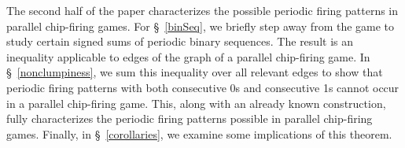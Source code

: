 The second half of the paper characterizes the possible periodic firing
patterns in parallel chip-firing games. For \S~\ref{binSeq}, we briefly step
away from the game to study certain signed sums of periodic binary
sequences. The result is an inequality applicable to edges of the graph of a
parallel chip-firing game. In \S~\ref{nonclumpiness}, we sum this inequality
over all relevant edges to show that periodic firing patterns with both
consecutive 0s and consecutive 1s cannot occur in a parallel chip-firing
game. This, along with an already known construction, fully characterizes the
periodic firing patterns possible in parallel chip-firing games. Finally, in
\S~\ref{corollaries}, we examine some implications of this theorem.
